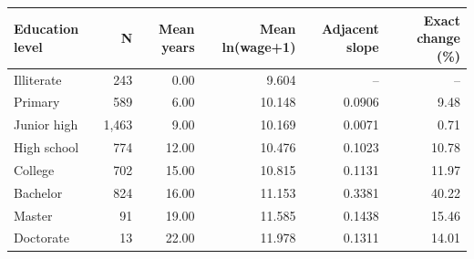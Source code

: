 \begin{tabular}{lrrrrr}
\toprule
Education level & N & Mean years & Mean ln(wage+1) & Adjacent slope & Exact change (\%) \\
\midrule
Illiterate & 243 & 0.00 & 9.604 & -- & -- \\
Primary & 589 & 6.00 & 10.148 & 0.0906 & 9.48 \\
Junior high & 1,463 & 9.00 & 10.169 & 0.0071 & 0.71 \\
High school & 774 & 12.00 & 10.476 & 0.1023 & 10.78 \\
College & 702 & 15.00 & 10.815 & 0.1131 & 11.97 \\
Bachelor & 824 & 16.00 & 11.153 & 0.3381 & 40.22 \\
Master & 91 & 19.00 & 11.585 & 0.1438 & 15.46 \\
Doctorate & 13 & 22.00 & 11.978 & 0.1311 & 14.01 \\
\bottomrule
\end{tabular}
